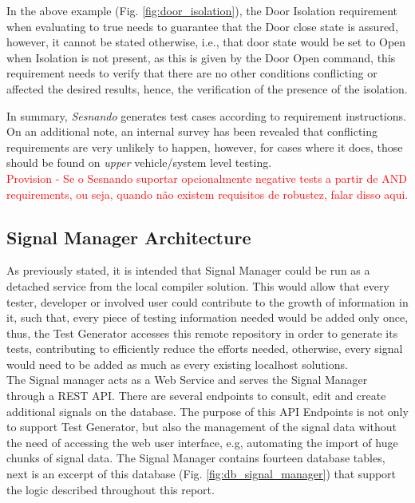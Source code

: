 In the above example (Fig. \ref{fig:door_isolation}), the Door Isolation requirement when evaluating to true needs to guarantee that the Door close state is assured, however, it cannot be stated otherwise, i.e., that door state would be set to Open when Isolation is not present, as this is given by the Door Open command, this requirement needs to verify that there are no other conditions conflicting or affected the desired results, hence, the verification of the presence of the isolation.

In summary, \textit{Sesnando} generates test cases according to requirement instructions.\\

On an additional note, an internal survey has been revealed that conflicting requirements are very unlikely to happen, however, for cases where it does, those should be found on \textit{upper} vehicle/system level testing.\\

\textcolor{red}{Provision - Se o Sesnando suportar opcionalmente negative tests a partir de AND requirements, ou seja, quando não existem requisitos de robustez, falar disso aqui.}\\


\subsection{Signal Manager Architecture}
\label{subsec:method_signal_manager}

As previously stated, it is intended that Signal Manager could be run as a detached service from the local compiler solution. This would allow that every tester, developer or involved user could contribute to the growth of information in it, such that, every piece of testing information needed would be added only once, thus, the Test Generator accesses this remote repository in order to generate its tests, contributing to efficiently reduce the efforts needed, otherwise, every signal would need to be added as much as every existing localhost solutions.\\
The Signal manager acts as a Web Service and serves the Signal Manager through a REST API. There are several endpoints to consult, edit and create additional signals on the database. The purpose of this API Endpoints is not only to support Test Generator, but also the management of the signal data without the need of accessing the web user interface, e.g, automating the import of huge chunks of signal data. The Signal Manager contains fourteen database tables, next is an excerpt of this database (Fig. \ref{fig:db_signal_manager}) that support the logic described throughout this report.\\

